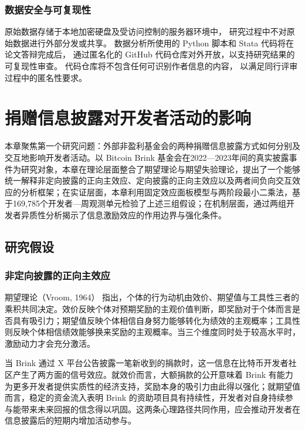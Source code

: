 \documentclass[
    type = master, %
    degree = professional,        %
    decl-page,  %
    twoside,                %
    fontset = fandol %
  ]{njuthesis}
\begin{document}
\subsection{数据安全与可复现性}

原始数据存储于本地加密硬盘及受访问控制的服务器环境中，
研究过程中不对原始数据进行外部分发或共享。
数据分析所使用的 Python 脚本和 Stata 代码将在论文答辩完成后，
通过匿名化的 GitHub 代码仓库对外开放，以支持研究结果的可复现性审查。
代码仓库将不包含任何可识别作者信息的内容，
以满足同行评审过程中的匿名性要求。


\chapter{捐赠信息披露对开发者活动的影响}

本章聚焦第一个研究问题：外部非盈利基金会的两种捐赠信息披露方式如何分别及交互地影响开发者活动。以 Bitcoin Brink 基金会在2022—2023年间的真实披露事件为研究对象，本章在理论层面整合了期望理论与期望失验理论，提出了一个能够统一解释非定向披露的正向主效应、定向披露的正向主效应以及两者间负向交互效应的分析框架；在实证层面，本章利用固定效应面板模型与两阶段最小二乘法，基于169,785个开发者—周观测单元检验了上述三组假设；在机制层面，通过两组开发者异质性分析揭示了信息激励效应的作用边界与强化条件。

\section{研究假设}
\label{sec:hypotheses-1}

\subsection{非定向披露的正向主效应}

期望理论（Vroom, 1964）\cite{vroom1964work} 指出，个体的行为动机由效价、期望值与工具性三者的乘积共同决定。效价反映个体对预期奖励的主观价值判断，即奖励对于个体而言是否具有吸引力；期望值反映个体相信自身努力能够转化为绩效的主观概率；工具性则反映个体相信绩效能够换来奖励的主观概率。当三个维度同时处于较高水平时，激励动力才会充分激活。

当 Brink 通过 X 平台公告披露一笔新收到的捐款时，这一信息在比特币开发者社区产生了两方面的信号效应。就效价而言，大额捐款的公开意味着 Brink 有能力为更多开发者提供实质性的经济支持，奖励本身的吸引力由此得以强化；就期望值而言，稳定的资金流入表明 Brink 的资助项目具有持续性，开发者对自身持续参与能带来未来回报的信念得以巩固。这两条心理路径共同作用，应会推动开发者在信息披露后的短期内增加活动参与。
\end{document}
